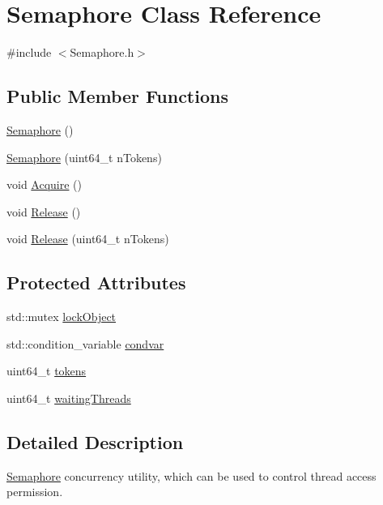 \hypertarget{class_semaphore}{\section{Semaphore Class Reference}
\label{class_semaphore}
}


{\ttfamily \#include $<$Semaphore.\+h$>$}

\subsection*{Public Member Functions}
\begin{DoxyCompactItemize}
\item 
\hyperlink{class_semaphore_ae32c955336ae9e60e20a3facde270714}{Semaphore} ()
\item 
\hyperlink{class_semaphore_acf6ed02177b6e51402920e5e562e9af1}{Semaphore} (uint64\+\_\+t n\+Tokens)
\item 
void \hyperlink{class_semaphore_ad328479493010f05e11b5ac1d2acd8cd}{Acquire} ()
\item 
void \hyperlink{class_semaphore_a915f834cca5bbe07c189411a310ee586}{Release} ()
\item 
void \hyperlink{class_semaphore_ab5f5466716df85582245482aa76d50a8}{Release} (uint64\+\_\+t n\+Tokens)
\end{DoxyCompactItemize}
\subsection*{Protected Attributes}
\begin{DoxyCompactItemize}
\item 
std\+::mutex \hyperlink{class_semaphore_a1a62705f4517e4142f19e255b48a389f}{lock\+Object}
\item 
std\+::condition\+\_\+variable \hyperlink{class_semaphore_ac5d7179cbad5988094c58f139641d9b4}{condvar}
\item 
uint64\+\_\+t \hyperlink{class_semaphore_a881a7148dec63cea7a8205b707101f81}{tokens}
\item 
uint64\+\_\+t \hyperlink{class_semaphore_a3d0314bc7ca67d2de9d5a4b5acf8fb18}{waiting\+Threads}
\end{DoxyCompactItemize}


\subsection{Detailed Description}
\hyperlink{class_semaphore}{Semaphore} concurrency utility, which can be used to control thread access permission. 

